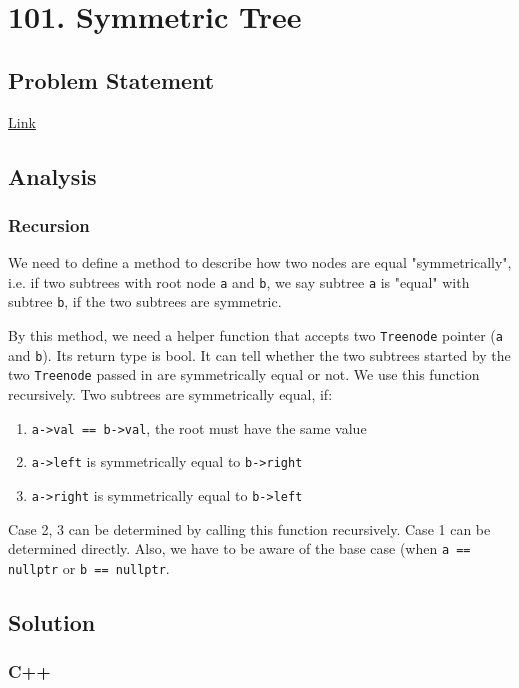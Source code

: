 \documentclass[12pt]{article}
\begin{document}
\section{101. Symmetric Tree}
\label{sec:orgbf7e26b}
\subsection{Problem Statement}
\label{sec:orgff73f1a}
\href{https://leetcode.com/problems/symmetric-tree/}{Link}
\subsection{Analysis}
\label{sec:org12ed21e}
\subsubsection{Recursion}
\label{sec:org4f3b16b}
We need to define a method to describe how two nodes are equal "symmetrically", i.e. if two subtrees with root node \texttt{a} and \texttt{b}, we say subtree \texttt{a} is "equal" with subtree \texttt{b}, if the two subtrees are symmetric.

By this method, we need a helper function that accepts two \texttt{Treenode} pointer (\texttt{a} and \texttt{b}). Its return type is bool. It can tell whether the two subtrees started by the two \texttt{Treenode} passed in are symmetrically equal or not. We use this function recursively. Two subtrees are symmetrically equal, if:
\begin{enumerate}
\item \texttt{a->val == b->val}, the root must have the same value
\item \texttt{a->left} is symmetrically equal to \texttt{b->right}
\item \texttt{a->right} is symmetrically equal to \texttt{b->left}
\end{enumerate}
Case 2, 3 can be determined by calling this function recursively. Case 1 can be determined directly. Also, we have to be aware of the base case (when \texttt{a == nullptr} or \texttt{b == nullptr}.

\subsection{Solution}
\label{sec:org655c27c}
\subsubsection{C++}
\label{sec:orgd718427}
\end{document}
